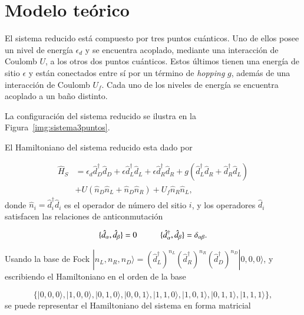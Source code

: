 \section{Modelo teórico}
El sistema reducido está compuesto por tres puntos cuánticos. Uno de ellos posee un nivel de energía $\epsilon_d$ y se encuentra acoplado, mediante una interacción de Coulomb $U$, a los otros dos puntos cuánticos. Estos últimos tienen una energía de sitio $\epsilon$ y están conectados entre sí por un término de \textit{hopping} $g$, además de una interacción de Coulomb $U_f$. Cada uno de los niveles de energía se encuentra acoplado a un baño distinto. 

La configuración del sistema reducido se ilustra en la Figura~\ref{img:sistema3puntos}.



El Hamiltoniano del sistema reducido esta dado por 

\begin{align*}
    \hat{H}_{S} & = \epsilon_{d}\hat{d}^{\dagger}_{D}\hat{d}_{D} + \epsilon \hat{d}^{\dagger}_{L}\hat{d}_{L} + \epsilon \hat{d}^{\dagger}_{R}\hat{d}_{R} + g(\hat{d}^{\dagger}_{L}\hat{d}_{R} + \hat{d}^{\dagger}_{R}\hat{d}_{L} ) \\
          & + U(\hat{n}_{D}\hat{n}_{L} + \hat{n}_{D}\hat{n}_{R} )  + U_{f}\hat{n}_{R}\hat{n}_{L},
\end{align*}
donde $\hat{n}_{i} = \hat{d}^{\dagger}_{i} \hat{d}_{i}$ es el operador de número del sitio $i$, y los operadores $\hat{d}_{i}$ satisfacen las relaciones de anticonmutación

\begin{equation*}
    \{\hat{d}_{\alpha},\hat{d}_{\beta} \} = 0  \hspace{10mm} \{\hat{d}^{\dagger}_{\alpha}, \hat{d}_{\beta} \} = \delta_{\alpha \beta}.
\end{equation*}

Usando la base de Fock $|n_{L},n_{R},n_{D} \rangle = (\hat{d}^{\dagger}_{L})^{n_{L}}(\hat{d}^{\dagger}_{R})^{n_{R}}(\hat{d}^{\dagger}_{D})^{n_{D}}|0,0,0\rangle$, y escribiendo el Hamiltoniano en el orden de la base 

\begin{equation*}
     \{|0,0,0\rangle, |1,0,0\rangle, |0,1,0\rangle, |0,0,1\rangle, |1,1,0\rangle, |1,0,1\rangle, |0,1,1\rangle, |1,1,1\rangle\},
\end{equation*}
se puede representar el Hamiltoniano del sistema en forma matricial 

